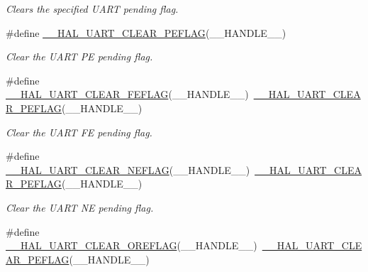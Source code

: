 \begin{DoxyCompactItemize}
\begin{DoxyCompactList}\small\item\em Clears the specified U\+A\+RT pending flag. \end{DoxyCompactList}\item 
\#define \mbox{\hyperlink{group___u_a_r_t___exported___macros_gaba5e19c60e0f37341b1585a380b84d49}{\+\_\+\+\_\+\+H\+A\+L\+\_\+\+U\+A\+R\+T\+\_\+\+C\+L\+E\+A\+R\+\_\+\+P\+E\+F\+L\+AG}}(\+\_\+\+\_\+\+H\+A\+N\+D\+L\+E\+\_\+\+\_\+)
\begin{DoxyCompactList}\small\item\em Clear the U\+A\+RT PE pending flag. \end{DoxyCompactList}\item 
\#define \mbox{\hyperlink{group___u_a_r_t___exported___macros_gae1dfc7777b089a10464841045b524caa}{\+\_\+\+\_\+\+H\+A\+L\+\_\+\+U\+A\+R\+T\+\_\+\+C\+L\+E\+A\+R\+\_\+\+F\+E\+F\+L\+AG}}(\+\_\+\+\_\+\+H\+A\+N\+D\+L\+E\+\_\+\+\_\+)~\mbox{\hyperlink{group___u_a_r_t___exported___macros_gaba5e19c60e0f37341b1585a380b84d49}{\+\_\+\+\_\+\+H\+A\+L\+\_\+\+U\+A\+R\+T\+\_\+\+C\+L\+E\+A\+R\+\_\+\+P\+E\+F\+L\+AG}}(\+\_\+\+\_\+\+H\+A\+N\+D\+L\+E\+\_\+\+\_\+)
\begin{DoxyCompactList}\small\item\em Clear the U\+A\+RT FE pending flag. \end{DoxyCompactList}\item 
\#define \mbox{\hyperlink{group___u_a_r_t___exported___macros_gaa1f69421585b3ada4d2b81d502a3ae6b}{\+\_\+\+\_\+\+H\+A\+L\+\_\+\+U\+A\+R\+T\+\_\+\+C\+L\+E\+A\+R\+\_\+\+N\+E\+F\+L\+AG}}(\+\_\+\+\_\+\+H\+A\+N\+D\+L\+E\+\_\+\+\_\+)~\mbox{\hyperlink{group___u_a_r_t___exported___macros_gaba5e19c60e0f37341b1585a380b84d49}{\+\_\+\+\_\+\+H\+A\+L\+\_\+\+U\+A\+R\+T\+\_\+\+C\+L\+E\+A\+R\+\_\+\+P\+E\+F\+L\+AG}}(\+\_\+\+\_\+\+H\+A\+N\+D\+L\+E\+\_\+\+\_\+)
\begin{DoxyCompactList}\small\item\em Clear the U\+A\+RT NE pending flag. \end{DoxyCompactList}\item 
\#define \mbox{\hyperlink{group___u_a_r_t___exported___macros_ga9cdc2f2d55eaaa7895996bf6848df42e}{\+\_\+\+\_\+\+H\+A\+L\+\_\+\+U\+A\+R\+T\+\_\+\+C\+L\+E\+A\+R\+\_\+\+O\+R\+E\+F\+L\+AG}}(\+\_\+\+\_\+\+H\+A\+N\+D\+L\+E\+\_\+\+\_\+)~\mbox{\hyperlink{group___u_a_r_t___exported___macros_gaba5e19c60e0f37341b1585a380b84d49}{\+\_\+\+\_\+\+H\+A\+L\+\_\+\+U\+A\+R\+T\+\_\+\+C\+L\+E\+A\+R\+\_\+\+P\+E\+F\+L\+AG}}(\+\_\+\+\_\+\+H\+A\+N\+D\+L\+E\+\_\+\+\_\+)

\end{DoxyCompactItemize}
